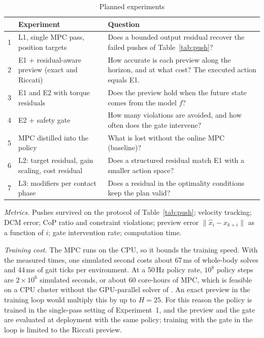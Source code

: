 \documentclass[conference]{IEEEtran}
\newcommand{\xh}{\hat{x}}
\begin{document}
\begin{table}[t]
\caption{Planned experiments}
\label{tab:exp}
\centering
\setlength{\tabcolsep}{3pt}
\begin{tabular}{@{}cp{}p{}@{}}
\toprule
 & Experiment & Question\\
\midrule
1 & L1, single MPC pass, position targets & Does a bounded output residual recover the failed pushes of Table~\ref{tab:push}?\\
2 & E1 + residual-aware preview (exact and Riccati) & How accurate is each preview along the horizon, and at what cost? The executed action equals E1.\\
3 & E1 and E2 with torque residuals & Does the preview hold when the future state comes from the model $f$?\\
4 & E2 + safety gate & How many violations are avoided, and how often does the gate intervene?\\
5 & MPC distilled into the policy & What is lost without the online MPC (baseline)?\\
6 & L2: target residual, gain scaling, cost residual & Does a structured residual match E1 with a smaller action space?\\
7 & L3: modifiers per contact phase & Does a residual in the optimality conditions keep the plan valid?\\
\bottomrule
\end{tabular}
\end{table}

\emph{Metrics.} Pushes survived on the protocol of Table~\ref{tab:push}; velocity tracking; DCM error; CoP ratio and constraint violations; preview error $\|\xh_i-x_{k+i}\|$ as a function of $i$; gate intervention rate; computation time.

\emph{Training cost.} The MPC runs on the CPU, so it bounds the training speed.
With the measured times, one simulated second costs about 67\,ms of whole-body solves and 44\,ms of gait ticks per environment.
At a 50\,Hz policy rate, $10^8$ policy steps are $2\times10^6$ simulated seconds, or about 60 core-hours of MPC, which is feasible on a CPU cluster without the GPU-parallel solver of \cite{jeon2025residualmpc}.
An exact preview in the training loop would multiply this by up to $H=25$.
For this reason the policy is trained in the single-pass setting of Experiment~1, and the preview and the gate are evaluated at deployment with the same policy; training with the gate in the loop is limited to the Riccati preview.
\end{document}
